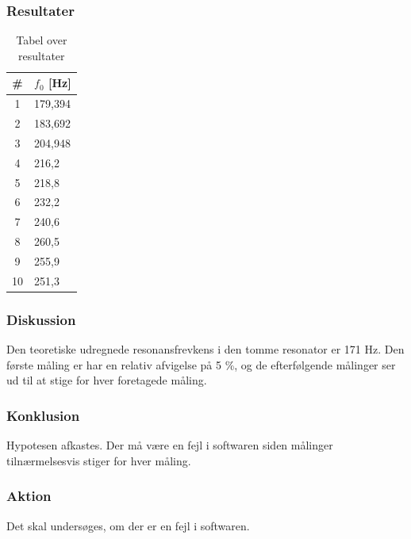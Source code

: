 	\subsubsection{Resultater}

			
		\begin{table}[htb]
\centering
\caption{Tabel over resultater}
\label{bordtest6resultater}
\begin{tabular}{c|l}
\textbf{\#}& \textbf{$f_{0}$ {[Hz]}} \\
\hline
1  &    179,394              \\
2  &    183,692             \\
3  &    204,948              \\
4  &    216,2              \\
5  &    218,8              \\
6  &    232,2              \\
7  &    240,6              \\
8  &    260,5              \\
9  &    255,9              \\
10 &    251,3             
\end{tabular}
\end{table}
			
	\subsubsection{Diskussion}
	Den teoretiske udregnede resonansfrevkens i den tomme resonator er 171 Hz. Den første måling er har en relativ afvigelse på 5 \%, og de efterfølgende målinger ser ud til at stige for hver foretagede måling.  
	
	\subsubsection{Konklusion}
	Hypotesen afkastes. Der må være en fejl i softwaren siden målinger tilnærmelsesvis stiger for hver måling. 
	
	\subsubsection{Aktion}
	Det skal undersøges, om der er en fejl i softwaren.	
	

